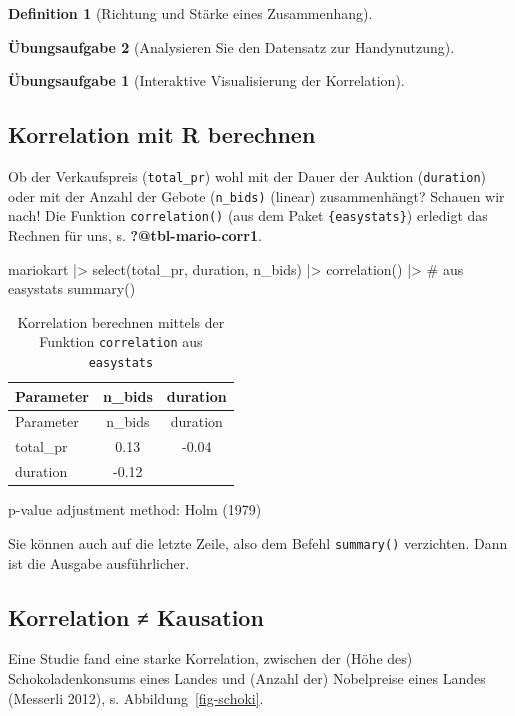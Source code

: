\documentclass[
  a4paper,
  DIV=11]{scrreprt}
\newenvironment{Shaded}{\begin{snugshade}}{\end{snugshade}}
\newcommand{\CommentTok}[1]{\textcolor[rgb]{0.37,0.37,0.37}{#1}}
\newcommand{\FunctionTok}[1]{\textcolor[rgb]{0.28,0.35,0.67}{#1}}
\newcommand{\NormalTok}[1]{\textcolor[rgb]{0.00,0.23,0.31}{#1}}
\newcommand{\SpecialCharTok}[1]{\textcolor[rgb]{0.37,0.37,0.37}{#1}}
\theoremstyle{definition}
\newtheorem{exercise}{Übungsaufgabe}[chapter]
\theoremstyle{definition}
\theoremstyle{definition}
\newtheorem{definition}{Definition}[chapter]
\theoremstyle{remark}
\begin{document}
\begin{definition}[Richtung und Stärke eines
Zusammenhang]
\begin{exercise}[Analysieren Sie den Datensatz zur
Handynutzung]
\begin{exercise}[Interaktive Visualisierung der
Korrelation]
\end{exercise}

\subsection{Korrelation mit R
berechnen}\label{korrelation-mit-r-berechnen}

Ob der Verkaufspreis (\texttt{total\_pr}) wohl mit der Dauer der Auktion
(\texttt{duration}) oder mit der Anzahl der Gebote (\texttt{n\_bids)}
(linear) zusammenhängt? Schauen wir nach! Die Funktion
\texttt{correlation()} (aus dem Paket \texttt{\{easystats\}}) erledigt
das Rechnen für uns, s. \textbf{?@tbl-mario-corr1}.

\begin{Shaded}
\begin{Highlighting}[]
\NormalTok{mariokart }\SpecialCharTok{|\textgreater{}} 
  \FunctionTok{select}\NormalTok{(total\_pr, duration, n\_bids) }\SpecialCharTok{|\textgreater{}} 
  \FunctionTok{correlation}\NormalTok{()  }\SpecialCharTok{|\textgreater{}}  \CommentTok{\# aus \textasciigrave{}easystats\textasciigrave{}}
  \FunctionTok{summary}\NormalTok{()}
\end{Highlighting}
\end{Shaded}

\begin{longtable}[]{@{}lcc@{}}
\caption{Korrelation berechnen mittels der Funktion \texttt{correlation}
aus \texttt{easystats}}\tabularnewline
\toprule\noalign{}
Parameter & n\_bids & duration \\
\midrule\noalign{}
\endfirsthead
\toprule\noalign{}
Parameter & n\_bids & duration \\
\midrule\noalign{}
\endhead
\bottomrule\noalign{}
\endlastfoot
total\_pr & 0.13 & -0.04 \\
duration & -0.12 & \\
\end{longtable}

p-value adjustment method: Holm (1979)

Sie können auch auf die letzte Zeile, also dem Befehl \texttt{summary()}
verzichten. Dann ist die Ausgabe ausführlicher.

\subsection{Korrelation ≠ Kausation}\label{korrelation-kausation}

Eine Studie fand eine starke Korrelation, zwischen der (Höhe des)
Schokoladenkonsums eines Landes und (Anzahl der) Nobelpreise eines
Landes (Messerli 2012), s. Abbildung~\ref{fig-schoki}.


\end{exercise}
\end{definition}
\end{document}
